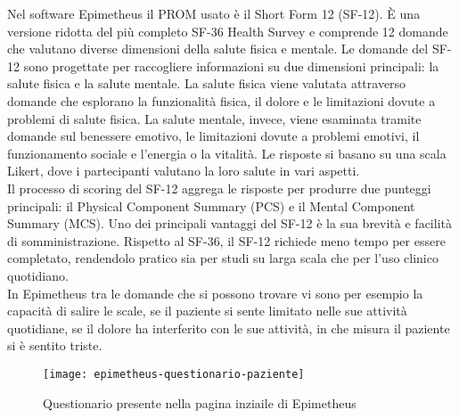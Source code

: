Nel software Epimetheus il PROM usato è il Short Form 12 (SF-12). È una versione ridotta del più completo SF-36 Health Survey e comprende 12 domande che valutano diverse dimensioni della salute fisica e mentale.
Le domande del SF-12 sono progettate per raccogliere informazioni su due dimensioni principali: la salute fisica e la salute mentale. La salute fisica viene valutata attraverso domande che esplorano la funzionalità fisica, il dolore e le limitazioni dovute a problemi di salute fisica. La salute mentale, invece, viene esaminata tramite domande sul benessere emotivo, le limitazioni dovute a problemi emotivi, il funzionamento sociale e l'energia o la vitalità. Le risposte si basano su una scala Likert, dove i partecipanti valutano la loro salute in vari aspetti.\\
Il processo di scoring del SF-12 aggrega le risposte per produrre due punteggi principali: il Physical Component Summary (PCS) e il Mental Component Summary (MCS). Uno dei principali vantaggi del SF-12 è la sua brevità e facilità di somministrazione. Rispetto al SF-36, il SF-12 richiede meno tempo per essere completato, rendendolo pratico sia per studi su larga scala che per l'uso clinico quotidiano. \\
In Epimetheus tra le domande che si possono trovare vi sono per esempio la capacità di salire le scale, se il paziente si sente limitato nelle sue attività quotidiane, se il dolore ha interferito con le sue attività, in che misura il paziente si è sentito triste. 

\begin{figure}[!ht] 
    \centering 
    \texttt{[image: epimetheus-questionario-paziente]} 
    \caption{Questionario presente nella pagina inziaile di Epimetheus}
\end{figure}